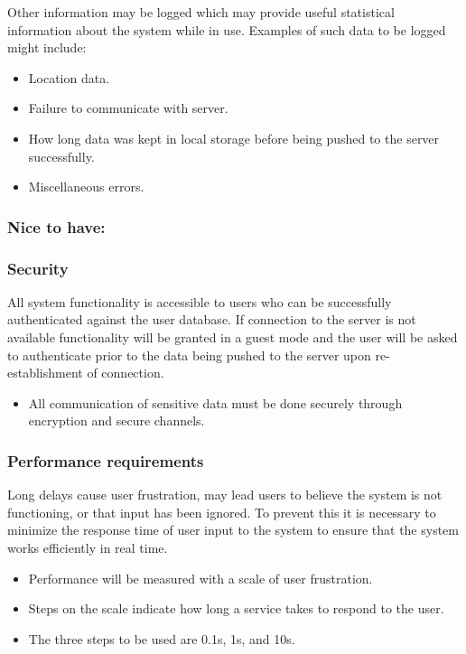 \documentclass[hidelinks,a4paper,12pt]{article}
\begin{document}
	Other information may be logged which may provide useful statistical information about the system while in use. Examples of such data to be logged might include:
	\begin{itemize}
		\item Location data.
		\item Failure to communicate with server.
		\item How long data was kept in local storage before being pushed to the server successfully.
		\item Miscellaneous errors.
	\end{itemize}
	
	\subsubsection{Nice to have:}
	
	\subsubsection*{Security}
	All system functionality is accessible to users who can be successfully authenticated against the user database. If connection to the server is not available functionality will be granted in a guest mode and the user will be asked to authenticate prior to the data being pushed to the server upon re-establishment of connection.
	\begin{itemize}
		\item All communication of sensitive data must be done securely through encryption and secure channels.
	\end{itemize}
	
	\subsubsection*{Performance requirements}	
	Long delays cause user frustration, may lead users to believe the system is not functioning, or that input has been ignored. To prevent this it is necessary to minimize the response time of user input to the system to ensure that the system works efficiently in real time.
	\begin{itemize}
		\item Performance will be measured with a scale of user frustration.
		\item Steps on the scale indicate how long a service takes to respond to the user.
		\item The three steps to be used are 0.1s, 1s, and 10s.
	\end{itemize}				
\end{document}
